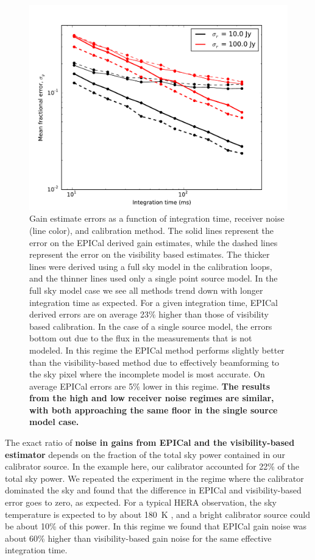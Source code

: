 \documentclass[a4paper,fleqn,usenatbib]{../mnras}
\begin{document}
\begin{figure}
\begin{center}
\includegraphics[width=\columnwidth]{fig6.pdf}
\caption{Gain estimate errors as a function of integration time, receiver noise (line color), and 
calibration method. The solid lines represent the error on the EPICal derived gain estimates, 
while the dashed lines represent the error on the visibility based estimates. The thicker lines 
were derived using a full sky model in the calibration loops, and the thinner lines used only a 
single point source model. In the full sky model case we see all methods trend down with 
longer integration time as expected. For a given integration time, EPICal derived errors are on 
average 23\% higher than those of visibility based calibration. In the case of a single source 
model, the errors bottom out due to the flux in the measurements that is not modeled. In this 
regime the EPICal method performs slightly better than the visibility-based method due to 
effectively beamforming to the sky pixel where the incomplete model is most accurate. On 
average EPICal errors are 5\% lower in this regime.
\textbf{The results from the high and low receiver noise regimes are similar, with both approaching the same floor in the single source model case.}
}
\label{fig:errors}
\end{center}
\end{figure}

The exact ratio of \textbf{noise in gains from EPICal and the visibility-based estimator}
depends on the fraction of 
the total sky power contained in our calibrator source. In the example here, our calibrator 
accounted for 22\% of the total sky power. We repeated the experiment in the regime where 
the calibrator dominated the sky and found that the difference in EPICal and visibility-based 
error goes to zero, as expected. For a typical HERA observation, the sky temperature is 
expected to by about 180~K \citep{jac15}, and a bright calibrator source could be about 10\% 
of this power. In this regime we found that EPICal gain noise was about 60\% higher than 
visibility-based gain noise for the same effective integration time.
\end{document}
